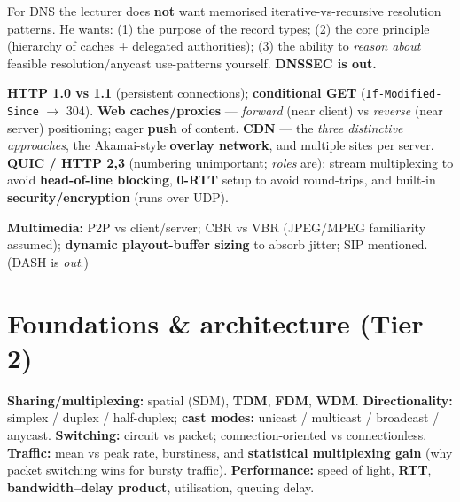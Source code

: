 \documentclass[11pt,a4paper]{article}
\begin{document}
\begin{gotcha}
For DNS the lecturer does \textbf{not} want memorised iterative-vs-recursive resolution patterns. He wants: (1) the purpose of the record types; (2) the core principle (hierarchy of caches $+$ delegated authorities); (3) the ability to \emph{reason about} feasible resolution/anycast use-patterns yourself. \textbf{DNSSEC is out.}
\end{gotcha}

\begin{must}[title=HTTP and content delivery]
\textbf{HTTP 1.0 vs 1.1} (persistent connections); \textbf{conditional GET} (\texttt{If-Modified-Since} $\to$ 304). \textbf{Web caches/proxies} --- \emph{forward} (near client) vs \emph{reverse} (near server) positioning; eager \textbf{push} of content. \textbf{CDN} --- the \emph{three distinctive approaches}, the Akamai-style \textbf{overlay network}, and multiple sites per server.\\[2pt]
\textbf{QUIC / HTTP 2,3} (numbering unimportant; \emph{roles} are): stream multiplexing to avoid \textbf{head-of-line blocking}, \textbf{0-RTT} setup to avoid round-trips, and built-in \textbf{security/encryption} (runs over UDP).
\end{must}

\begin{useful}
\textbf{Multimedia:} P2P vs client/server; CBR vs VBR (JPEG/MPEG familiarity assumed); \textbf{dynamic playout-buffer sizing} to absorb jitter; SIP mentioned. (DASH is \emph{out}.)
\end{useful}

\section{Foundations \& architecture (Tier 2)}

\begin{must}[title=Foundations]
\textbf{Sharing/multiplexing:} spatial (SDM), \textbf{TDM}, \textbf{FDM}, \textbf{WDM}. \textbf{Directionality:} simplex / duplex / half-duplex; \textbf{cast modes:} unicast / multicast / broadcast / anycast. \textbf{Switching:} circuit vs packet; connection-oriented vs connectionless. \textbf{Traffic:} mean vs peak rate, burstiness, and \textbf{statistical multiplexing gain} (why packet switching wins for bursty traffic). \textbf{Performance:} speed of light, \textbf{RTT}, \textbf{bandwidth--delay product}, utilisation, queuing delay.
\end{must}
\end{document}
